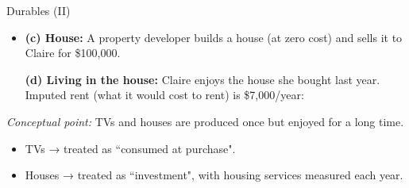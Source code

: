 \documentclass[10pt,aspectratio=169]{beamer}
\begin{document}
\begin{frame}{Durables (II)}

\begin{itemize}
\item \textbf{(c) House:}  
A property developer builds a house (at zero cost) and sells it to Claire for \$100,000.  

\begin{table}
\end{table}

\itemvso \textbf{(d) Living in the house:}  
Claire enjoys the house she bought last year. Imputed rent (what it would cost to rent) is \$7,000/year:  
\vspace{0.2cm}
\begin{table}
\end{table}

\end{itemize}
\vspace{0.3cm}
\textit{Conceptual point:}  
TVs and houses are produced once but enjoyed for a long time.  
\begin{itemize}
\item TVs → treated as ``consumed at purchase".
\item Houses → treated as ``investment", with housing services measured each year.  
\end{itemize}


\end{frame}
\end{document}
